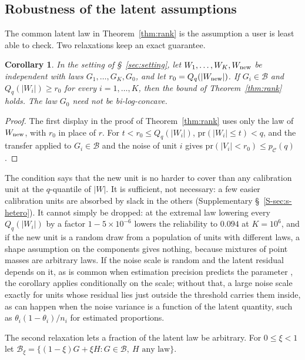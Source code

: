 \documentclass[12pt]{article}
\newtheorem{corollary}{Corollary}
\theoremstyle{definition}
\newcommand{\pr}{\mathrm{pr}}
\newcommand{\B}{\mathcal{B}}
\newcommand{\E}{\mathcal{C}}
\begin{document}
\subsection{Robustness of the latent assumptions}\label{sec:robust}

The common latent law in Theorem~\ref{thm:rank} is the assumption a user is least able to check. Two relaxations keep an exact guarantee.

\begin{corollary}\label{cor:hetero}
In the setting of \S~\ref{sec:setting}, let $W_1, \ldots, W_K, W_{\rm new}$ be independent with laws $G_1, \ldots, G_K, G_0$, and let $r_0 = Q_q(|W_{\rm new}|)$. If $G_i \in \B$ and $Q_q(|W_i|) \ge r_0$ for every $i = 1, \ldots, K$, then the bound of Theorem~\ref{thm:rank} holds. The law $G_0$ need not be bi-log-concave.
\end{corollary}

\begin{proof}
The first display in the proof of Theorem~\ref{thm:rank} uses only the law of $W_{\rm new}$, with $r_0$ in place of $r$. For $t < r_0 \le Q_q(|W_i|)$, $\pr(|W_i| \le t) < q$, and the transfer applied to $G_i \in \B$ and the noise of unit $i$ gives $\pr(|V_i| < r_0) \le p_{\E}(q)$.
\end{proof}

The condition says that the new unit is no harder to cover than any calibration unit at the $q$-quantile of $|W|$. It is sufficient, not necessary: a few easier calibration units are absorbed by slack in the others (Supplementary \S~\ref{S-sec:s-hetero}). It cannot simply be dropped: at the extremal law lowering every $Q_q(|W_i|)$ by a factor $1 - 5 \times 10^{-6}$ lowers the reliability to $0.094$ at $K = 10^6$, and if the new unit is a random draw from a population of units with different laws, a shape assumption on the components gives nothing, because mixtures of point masses are arbitrary laws. If the noise scale is random and the latent residual depends on it, as is common when estimation precision predicts the parameter \citep{chen2026}, the corollary applies conditionally on the scale; without that, a large noise scale exactly for units whose residual lies just outside the threshold carries them inside, as can happen when the noise variance is a function of the latent quantity, such as $\theta_i(1 - \theta_i)/n_i$ for estimated proportions.

The second relaxation lets a fraction of the latent law be arbitrary. For $0 \le \xi < 1$ let $\B_\xi = \{(1 - \xi)G + \xi H : G \in \B,\ H \text{ any law}\}$.
\end{document}
